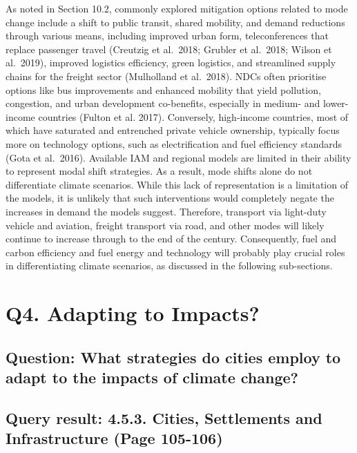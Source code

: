 \documentclass[
  letterpaper,
  DIV=11,
  numbers=noendperiod]{scrreprt}
\begin{document}
As noted in Section 10.2, commonly explored mitigation options related
to mode change include a shift to public transit, shared mobility, and
demand reductions through various means, including improved urban form,
teleconferences that replace passenger travel (Creutzig et al.~2018;
Grubler et al.~2018; Wilson et al.~2019), improved logistics efficiency,
green logistics, and streamlined supply chains for the freight sector
(Mulholland et al.~2018). NDCs often prioritise options like bus
improvements and enhanced mobility that yield pollution, congestion, and
urban development co-benefits, especially in medium- and lower-income
countries (Fulton et al. 2017). Conversely, high-income countries, most
of which have saturated and entrenched private vehicle ownership,
typically focus more on technology options, such as electrification and
fuel efficiency standards (Gota et al.~2016). Available IAM and regional
models are limited in their ability to represent modal shift strategies.
As a result, mode shifts alone do not differentiate climate scenarios.
While this lack of representation is a limitation of the models, it is
unlikely that such interventions would completely negate the increases
in demand the models suggest. Therefore, transport via light-duty
vehicle and aviation, freight transport via road, and other modes will
likely continue to increase through to the end of the century.
Consequently, fuel and carbon efficiency and fuel energy and technology
will probably play crucial roles in differentiating climate scenarios,
as discussed in the following sub-sections.


\hypertarget{q4.-adapting-to-impacts}{%
\chapter{Q4. Adapting to Impacts?}\label{q4.-adapting-to-impacts}}

\hypertarget{question-what-strategies-do-cities-employ-to-adapt-to-the-impacts-of-climate-change}{%
\section{Question: What strategies do cities employ to adapt to the
impacts of climate
change?}\label{question-what-strategies-do-cities-employ-to-adapt-to-the-impacts-of-climate-change}}

\hypertarget{query-result-4.5.3.-cities-settlements-and-infrastructure-page-105-106}{%
\section{Query result: 4.5.3. Cities, Settlements and Infrastructure
(Page
105-106)}\label{query-result-4.5.3.-cities-settlements-and-infrastructure-page-105-106}}
\end{document}
